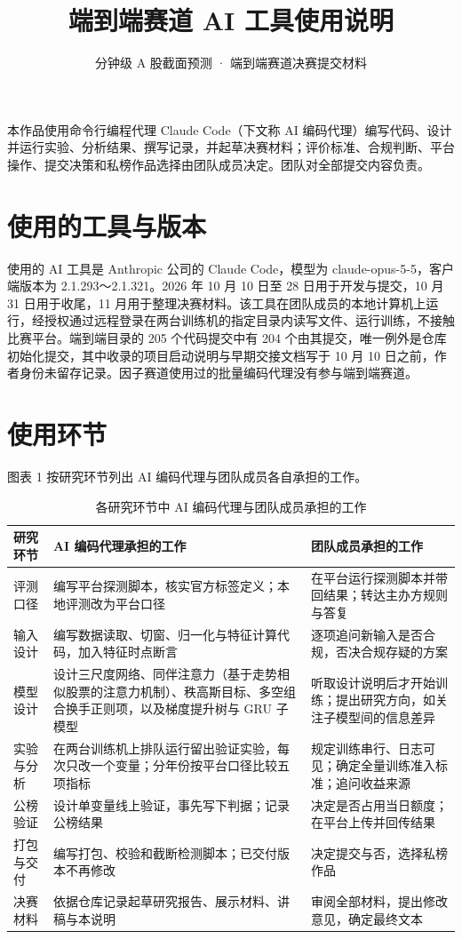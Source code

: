 \documentclass[UTF8,a4paper,zihao=-4,fontset=none]{ctexart}
\title{端到端赛道 AI 工具使用说明}
\subtitle{分钟级 A 股截面预测 · 端到端赛道决赛提交材料}
\newcommand{\tabsetup}{\small\linespread{1.15}\selectfont\renewcommand{\arraystretch}{1.15}}
\begin{document}
\makereporttitle

本作品使用命令行编程代理 Claude Code（下文称 AI 编码代理）编写代码、设计并运行实验、分析结果、撰写记录，并起草决赛材料；评价标准、合规判断、平台操作、提交决策和私榜作品选择由团队成员决定。团队对全部提交内容负责。

\section{使用的工具与版本}

使用的 AI 工具是 Anthropic 公司的 Claude Code，模型为 claude-opus-5-5，客户端版本为 2.1.293～2.1.321。2026 年 10 月 10 日至 28 日用于开发与提交，10 月 31 日用于收尾，11 月用于整理决赛材料。该工具在团队成员的本地计算机上运行，经授权通过远程登录在两台训练机的指定目录内读写文件、运行训练，不接触比赛平台。端到端目录的 205 个代码提交中有 204 个由其提交，唯一例外是仓库初始化提交，其中收录的项目启动说明与早期交接文档写于 10 月 10 日之前，作者身份未留存记录。因子赛道使用过的批量编码代理没有参与端到端赛道。

\section{使用环节}

图表 1 按研究环节列出 AI 编码代理与团队成员各自承担的工作。

\begin{table}[!htbp]
\caption{各研究环节中 AI 编码代理与团队成员承担的工作}
\centering\tabsetup
\begin{tabularx}{\textwidth}{@{}p{5em}>{\raggedright\arraybackslash\hsize=1.1\hsize}X>{\raggedright\arraybackslash\hsize=0.9\hsize}X@{}}
\toprule
研究环节 & AI 编码代理承担的工作 & 团队成员承担的工作\\
\midrule
评测口径 & 编写平台探测脚本，核实官方标签定义；本地评测改为平台口径 & 在平台运行探测脚本并带回结果；转达主办方规则与答复\\
输入设计 & 编写数据读取、切窗、归一化与特征计算代码，加入特征时点断言 & 逐项追问新输入是否合规，否决合规存疑的方案\\
模型设计 & 设计三尺度网络、同伴注意力（基于走势相似股票的注意力机制）、秩高斯目标、多空组合换手正则项，以及梯度提升树与 GRU 子模型 & 听取设计说明后才开始训练；提出研究方向，如关注子模型间的信息差异\\
实验与分析 & 在两台训练机上排队运行留出验证实验，每次只改一个变量；分年份按平台口径比较五项指标 & 规定训练串行、日志可见；确定全量训练准入标准；追问收益来源\\
公榜验证 & 设计单变量线上验证，事先写下判据；记录公榜结果 & 决定是否占用当日额度；在平台上传并回传结果\\
打包与交付 & 编写打包、校验和截断检测脚本；已交付版本不再修改 & 决定提交与否，选择私榜作品\\
决赛材料 & 依据仓库记录起草研究报告、展示材料、讲稿与本说明 & 审阅全部材料，提出修改意见，确定最终文本\\
\bottomrule
\end{tabularx}
\end{table}
\end{document}
